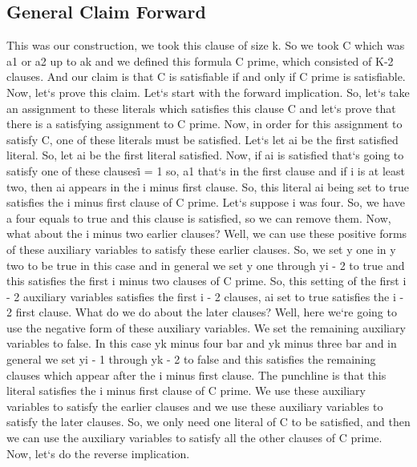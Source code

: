 \subsection{General Claim  Forward}
This was our construction, we took this clause of size k.
So we took C which was a1 or a2 up to ak and we defined this formula C prime, which consisted of K-2 clauses.
And our claim is that C is satisfiable if and only if C prime is satisfiable.
Now, let`s prove this claim.
Let`s start with the forward implication.
So, let`s take an assignment to these literals which satisfies this clause C and let`s prove that there is a satisfying assignment to C prime.
Now, in order for this assignment to satisfy C, one of these literals must be satisfied.
Let`s let ai be the first satisfied literal.
So, let ai be the first literal satisfied.
Now, if ai is satisfied that`s going to satisfy one of these clauses\. i = 1 so, a1 that`s in the first clause and if i is at least two, then ai appears in the i minus first clause.
So, this literal ai being set to true satisfies the i minus first clause of C prime.
Let`s suppose i was four.
So, we have a four equals to true and this clause is satisfied, so we can remove them.
Now, what about the i minus two earlier clauses? Well, we can use these positive forms of these auxiliary variables to satisfy these earlier clauses.
So, we set y one in y two to be true in this case and in general we set y one through yi - 2 to true and this satisfies the first i minus two clauses of C prime.
So, this setting of the first i - 2 auxiliary variables satisfies the first i - 2 clauses, ai set to true satisfies the i - 2 first clause.
What do we do about the later clauses? Well, here we`re going to use the negative form of these auxiliary variables.
We set the remaining auxiliary variables to false.
In this case yk minus four bar and yk minus three bar and in general we set yi - 1 through yk - 2 to false and this satisfies the remaining clauses which appear after the i minus first clause.
The punchline is that this literal satisfies the i minus first clause of C prime.
We use these auxiliary variables to satisfy the earlier clauses and we use these auxiliary variables to satisfy the later clauses.
So, we only need one literal of C to be satisfied, and then we can use the auxiliary variables to satisfy all the other clauses of C prime.
Now, let`s do the reverse implication.

